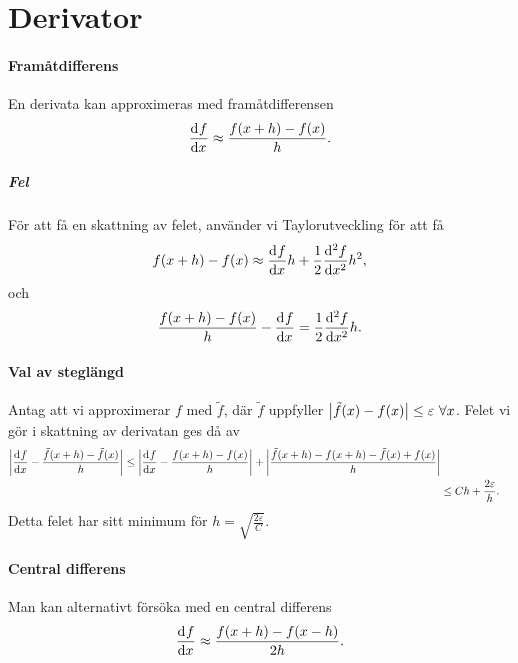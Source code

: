 \section{Derivator}

\paragraph{Framåtdifferens}
En derivata kan approximeras med framåtdifferensen
\begin{align*}
	\dv[]{f}{x} (x) \approx \frac{f(x + h) - f(x)}{h}.
\end{align*}

\subparagraph{Fel}
För att få en skattning av felet, använder vi Taylorutveckling för att få
\begin{align*}
	f(x + h) - f(x) \approx \dv[]{f}{x} (x)h + \frac{1}{2}\dv[2]{f}{x} (c)h^{2},
\end{align*}
och
\begin{align*}
	\frac{f(x + h) - f(x)}{h} - \dv[]{f}{x} (x) = \frac{1}{2}\dv[2]{f}{x} (c)h.
\end{align*}

\paragraph{Val av steglängd}
Antag att vi approximerar $f$ med $\tilde{f}$, där $\tilde{f}$ uppfyller $\abs{\tilde{f}(x) - f(x)} \leq \varepsilon\ \forall x$. Felet vi gör i skattning av derivatan ges då av
\begin{align*}
	\abs{\dv[]{f}{x} (x) - \frac{\tilde{f}(x + h) - \tilde{f}(x)}{h}} \leq \abs{\dv[]{f}{x} (x) - \frac{f(x + h) - f(x)}{h}} + \abs{\frac{\tilde{f}(x + h) - f(x + h) - \tilde{f}(x) + f(x)}{h}} \\
	                                                                  &\leq Ch + \frac{2\varepsilon}{h}.
\end{align*}
Detta felet har sitt minimum för $h = \sqrt{\frac{2\varepsilon}{C}}$.

\paragraph{Central differens}
Man kan alternativt försöka med en central differens
\begin{align*}
	\dv[]{f}{x} (x) \approx \frac{f(x + h) - f(x - h)}{2h}.
\end{align*}

